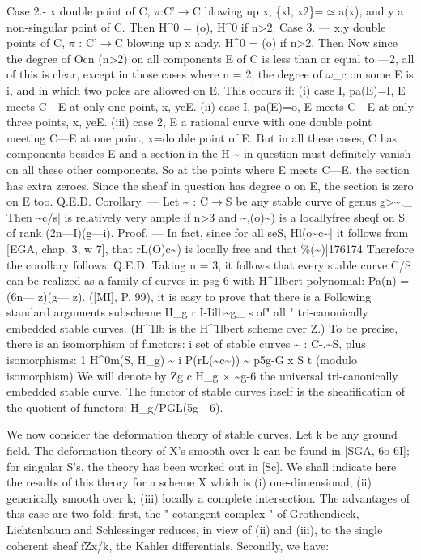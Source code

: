 \documentclass[11pt]{article}
\theoremstyle{plain}
\theoremstyle{definition}
\theoremstyle{remark}
\begin{document}
Case 2.- x double point of C, $\pi$:C'$\to$C blowing up x, \{xl, x2\}=$\simeq$a(x), and y a non-singular point of C. Then H\textasciicircum{}0 = (o), H\textasciicircum{}0 if n>2. Case 3. --- x,y double points of C, $\pi$ : C'$\to$C blowing up x andy. H\textasciicircum{}0 = (o) if n>2. Then Now since the degree of Ocn (n>2) on all components E of C is less than or equal to ---2, all of this is clear, except in those cases where n = 2, the degree of $\omega$\_c on some E is i, and in which two poles are allowed on E. This occurs if: (i) case I, pa(E)=I, E meets C---E at only one point, x, yeE. (ii) case I, pa(E)=o, E meets C---E at only three points, x, yeE. (iii) case 2, E a rational curve with one double point meeting C---E at one point, x=double point of E. But in all these cases, C has components besides E and a section in the H \textasciitilde{} in question must definitely vanish on all these other components. So at the points where E meets C---E, the section has extra zeroes. Since the sheaf in question has degree o on E, the section is zero on E too. Q.E.D. Corollary. --- Let \textasciitilde{} : C$\to$S be any stable curve of genus g>\textasciitilde{}.\_ Then \textasciitilde{}c/s| is relatively very ample if n>3 and \textasciitilde{},(o)\textasciitilde{}) is a locallyfree sheqf on S of rank (2n---I)(g---i). Proof. --- In fact, since for all seS, Hl(o\textasciitilde{}c\textasciitilde{}| it follows from [EGA, chap. 3, w 7], that rL(O)c\textasciitilde{}) is locally free and that \%(\textasciitilde{})|176174 Therefore the corollary follows. Q.E.D. Taking n = 3, it follows that every stable curve C/S can be realized as a family of curves in psg-6 with H\textasciicircum{}1lbert polynomial: Pa(n) = (6n--- z)(g--- z). ([MI], P. 99), it is easy to prove that there is a Following standard arguments subscheme H\_g r I-Iilb\textasciitilde{}g\_ s of" all " tri-canonically embedded stable curves. (H\textasciicircum{}1lb is the H\textasciicircum{}1lbert scheme over Z.) To be precise, there is an isomorphism of functors: i set of stable curves \textasciitilde{} : C-.\textasciitilde{}S, plus isomorphisms: 1 H\textasciicircum{}0m(S, H\_g) \textasciitilde{} i P(rL(\textasciitilde{}c\textasciitilde{})) \textasciitilde{} p5g-G x S t (modulo isomorphism) We will denote by Zg c H\_g $\times$ \textasciitilde{}g-6 the universal tri-canonically embedded stable curve. The functor of stable curves itself is the sheafification of the quotient of functors: H\_g/PGL(5g---6).

We now consider the deformation theory of stable curves. Let k be any ground field. The deformation theory of X's smooth over k can be found in [SGA, 6o-6I]; for singular S's, the theory has been worked out in [Sc]. We shall indicate here the results of this theory for a scheme X which is (i) one-dimensional; (ii) generically smooth over k; (iii) locally a complete intersection. The advantages of this case are two-fold: first, the " cotangent complex " of Grothendieck, Lichtenbaum and Schlessinger reduces, in view of (ii) and (iii), to the single coherent sheaf fZx/k, the Kahler differentials. Secondly, we have:
\end{document}
